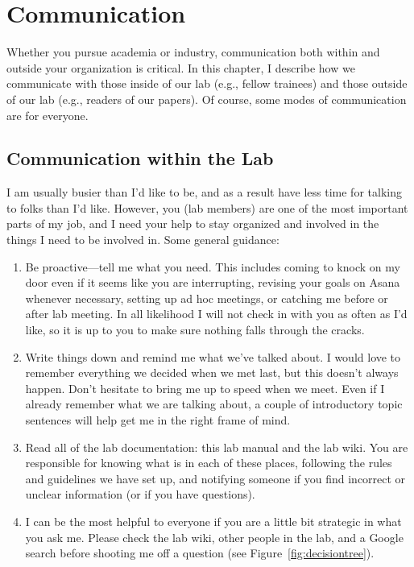 \documentclass[letterpaper,11pt,oneside]{memoir}
\begin{document}
\chapter{Communication}

Whether you pursue academia or industry, communication both within and outside your organization is critical. In this chapter, I describe how we communicate with those inside of our lab (e.g., fellow trainees) and those outside of our lab (e.g., readers of our papers). Of course, some modes of communication are for everyone.

\section{Communication within the Lab}
\label{sec:communicationInLab}

I am usually busier than I'd like to be, and as a result have less time for talking to folks than I'd like. However, you (lab members) are one of the most important parts of my job, and I need your help to stay organized and involved in the things I need to be involved in. Some general guidance:

\begin{enumerate}
\item Be proactive---tell me what you need. This includes coming to knock on my door even if it seems like you are interrupting, revising your goals on Asana whenever necessary, setting up ad hoc meetings, or catching me before or after lab meeting. In all likelihood I will not check in with you as often as I'd like, so it is up to you to make sure nothing falls through the cracks.
\item Write things down and remind me what we've talked about. I would love to remember everything we decided when we met last, but this doesn't always happen. Don't hesitate to bring me up to speed when we meet. Even if I already remember what we are talking about, a couple of introductory topic sentences will help get me in the right frame of mind.
\item Read all of the lab documentation: this lab manual and the lab wiki. You are responsible for knowing what is in each of these places, following the rules and guidelines we have set up, and notifying someone if you find incorrect or unclear information (or if you have questions).
\item I can be the most helpful to everyone if you are a little bit strategic in what you ask me. Please check the lab wiki, other people in the lab, and a Google search before shooting me off a question (see Figure~\ref{fig:decisiontree}).
\end{enumerate}
\end{document}
